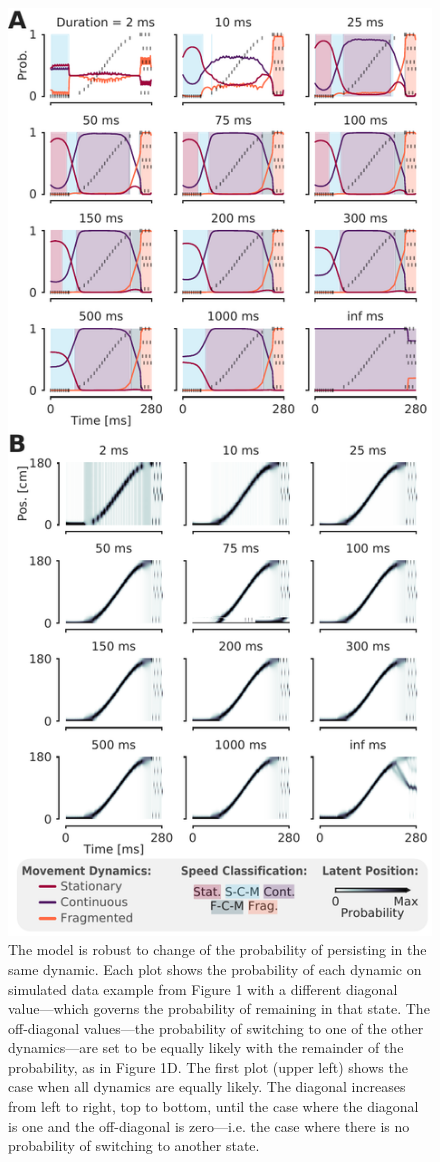 \documentclass[times, twoside]{zHenriquesLab-StyleBioRxiv}
\begin{document}
\begin{figure}%
\centering
\includegraphics[width=0.8\linewidth]{figures/Figure1-supplemental1/Figure1_v3_supplemental1}
\caption{The model is robust to change of the probability of persisting in the same dynamic. Each plot shows the probability of each dynamic on simulated data example from Figure 1 with a different diagonal value---which governs the probability of remaining in that state. The off-diagonal values---the probability of switching to one of the other dynamics---are set to be equally likely with the remainder of the probability, as in Figure 1D. The first plot (upper left) shows the case when all dynamics are equally likely. The diagonal increases from left to right, top to bottom, until the case where the diagonal is one and the off-diagonal is zero---i.e. the case where there is no probability of switching to another state.}
\label{fig:Figure1-Figure supplement 1}
\end{figure}
\end{document}
